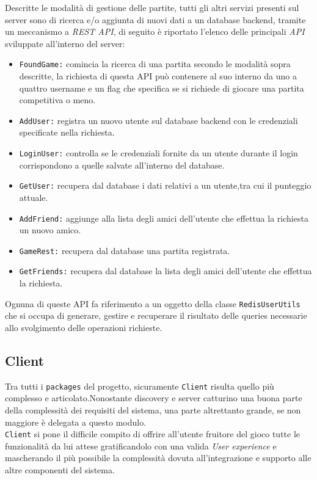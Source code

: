  Descritte le modalità di gestione delle partite, tutti gli altri servizi presenti sul server sono di ricerca e/o aggiunta di nuovi dati a un database backend, tramite un meccanismo a \textit{REST API}, di seguito è riportato l'elenco delle principali \textit{API} sviluppate all'interno del server:
 \begin{itemize}
   \item{\texttt{FoundGame:}} comincia la ricerca di una partita secondo le modalità sopra descritte, la richiesta di questa API può contenere al suo interno da uno a quattro username e un flag che specifica se si richiede di giocare una partita competitiva o meno.

   \item{\texttt{AddUser:}} registra un nuovo utente sul database backend con le credenziali specificate nella richiesta.

   \item{\texttt{LoginUser:}} controlla se le credenziali fornite da un utente durante il login corrispondono a quelle salvate all'interno del database.

   \item{\texttt{GetUser:}} recupera dal database i dati relativi a un utente,tra cui il punteggio attuale.

   \item{\texttt{AddFriend:}} aggiunge alla lista degli amici dell'utente che effettua la richiesta un nuovo amico.

    \item{\texttt{GameRest:}} recupera dal database una partita registrata.

    \item{\texttt{GetFriends:}} recupera dal database la lista degli amici dell'utente che effettua la richiesta.
 \end{itemize}

 Ognuna di queste API fa riferimento a un oggetto della classe \texttt{RedisUserUtils} che si occupa di generare, gestire e recuperare il risultato delle queries necessarie allo svolgimento delle operazioni richieste.

  \subsection {Client}\label{subsec:details:client}
  Tra tutti i \texttt{packages} del progetto, sicuramente \texttt{Client} risulta quello più complesso e articolato.Nonostante discovery e server catturino una buona parte della complessità dei requisiti del sistema, una parte altrettanto grande, se non maggiore è delegata a questo modulo.\\
  \texttt{Client} si pone il difficile compito di offrire all'utente fruitore del gioco tutte le funzionalità da lui attese gratificandolo con una valida \textit{User experience} e mascherando il più possibile la complessità dovuta all'integrazione e supporto alle altre componenti del sistema.

